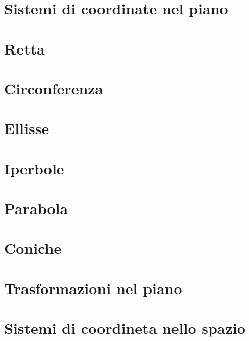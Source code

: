 \section{Sistemi di coordinate nel piano}
\section{Retta}
\section{Circonferenza}
\section{Ellisse}
\section{Iperbole}
\section{Parabola}
\section{Coniche}
\section{Trasformazioni nel piano}
\section{Sistemi di coordineta nello spazio}